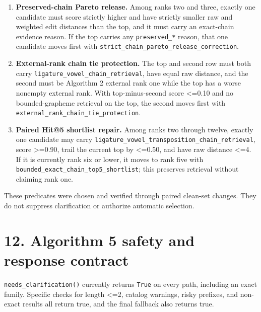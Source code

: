 \begin{enumerate}
\def\labelenumi{\arabic{enumi}.}
\tightlist
\item
  \textbf{Preserved-chain Pareto release.} Among ranks two and three, exactly one candidate must score strictly higher and have strictly smaller raw and weighted edit distances than the top, and it must carry an exact-chain evidence reason. If the top carries any \texttt{preserved\_\allowbreak{}*} reason, that one candidate moves first with \texttt{strict\_\allowbreak{}chain\_\allowbreak{}pareto\_\allowbreak{}release\_\allowbreak{}correction}.
\item
  \textbf{External-rank chain tie protection.} The top and second row must both carry \texttt{ligature\_\allowbreak{}vowel\_\allowbreak{}chain\_\allowbreak{}retrieval}, have equal raw distance, and the second must be Algorithm 2 external rank one while the top has a worse nonempty external rank. With top-minus-second score \textless=0.10 and no bounded-grapheme retrieval on the top, the second moves first with \texttt{external\_\allowbreak{}rank\_\allowbreak{}chain\_\allowbreak{}tie\_\allowbreak{}protection}.
\item
  \textbf{Paired Hit@5 shortlist repair.} Among ranks two through twelve, exactly one candidate may carry \texttt{ligature\_\allowbreak{}vowel\_\allowbreak{}transposition\_\allowbreak{}chain\_\allowbreak{}retrieval}, score \textgreater=0.90, trail the current top by \textless=0.50, and have raw distance \textless=4. If it is currently rank six or lower, it moves to rank five with \texttt{bounded\_\allowbreak{}exact\_\allowbreak{}chain\_\allowbreak{}top5\_\allowbreak{}shortlist}; this preserves retrieval without claiming rank one.
\end{enumerate}

These predicates were chosen and verified through paired clean-set changes. They do not suppress clarification or authorize automatic selection.

\section{12. Algorithm 5 safety and response contract}\label{12-algorithm-5-safety-and-response-contract}

\texttt{needs\_\allowbreak{}clarification()} currently returns \texttt{True} on every path, including an exact family. Specific checks for length \textless=2, catalog warnings, risky prefixes, and non-exact results all return true, and the final fallback also returns true.

